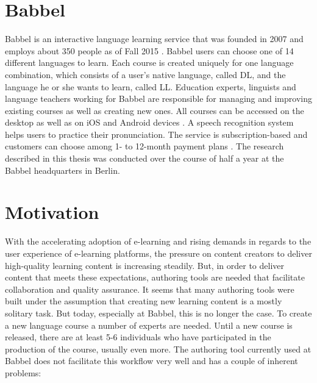 \section{Babbel}
Babbel is an interactive language learning service that was founded in 2007 and employs about 350 people as of Fall 2015 \cite{_babbel_????}. Babbel users can choose one of 14 different languages to learn. Each course is created uniquely for one language combination, which consists of a user's native language, called \ac{DL}, and the language he or she wants to learn, called \ac{LL}. Education experts, linguists and language teachers working for Babbel are responsible for managing and improving existing courses as well as creating new ones. All courses can be accessed on the desktop as well as on iOS and Android devices \cite{_learn_????}. A speech recognition system helps users to practice their pronunciation. The service is subscription-based and customers can choose among 1- to 12-month payment plans \cite{_prices_????}. 
The research described in this thesis was conducted over the course of half a year at the Babbel headquarters in Berlin.

\section{Motivation} %
With the accelerating adoption of e-learning and rising demands in regards to the user experience of e-learning platforms, the pressure on content creators to deliver high-quality learning content is increasing steadily. But, in order to deliver content that meets these expectations, authoring tools are needed that facilitate collaboration and quality assurance. It seems that many authoring tools were built under the assumption that creating new learning content is a mostly solitary task. But today, especially at Babbel, this is no longer the case. To create a new language course a number of experts are needed. Until a new course is released, there are at least 5-6 individuals who have participated in the production of the course, usually even more. The authoring tool currently used at Babbel does not facilitate this workflow very well and has a couple of inherent problems:


